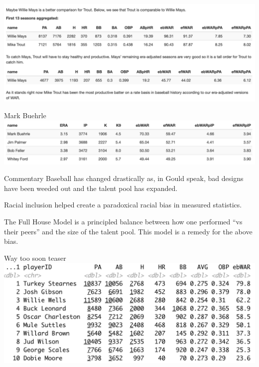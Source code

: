 \documentclass[
  ignorenonframetext,
]{beamer}
\begin{document}
\begin{frame}{}
\protect\hypertarget{section-17}{}
\includegraphics{TroutvsMays.png}
\end{frame}

\begin{frame}{Mark Buehrle}
\protect\hypertarget{mark-buehrle}{}
\includegraphics{BuehrleHOF.png}
\end{frame}

\begin{frame}{Commentary}
\protect\hypertarget{commentary}{}
Baseball has changed drastically as, in Gould speak, bad designs have
been weeded out and the talent pool has expanded.

\vspace{12pt}

Racial inclusion helped create a paradoxical racial bias in measured
statistics.

\vspace{12pt}

The Full House Model is a principled balance between how one performed
``vs their peers'' and the size of the talent pool. This model is a
remedy for the above bias.
\end{frame}

\begin{frame}{Way too soon teaser}
\protect\hypertarget{way-too-soon-teaser}{}
\includegraphics{top10NGL.png}
\end{frame}
\end{document}
